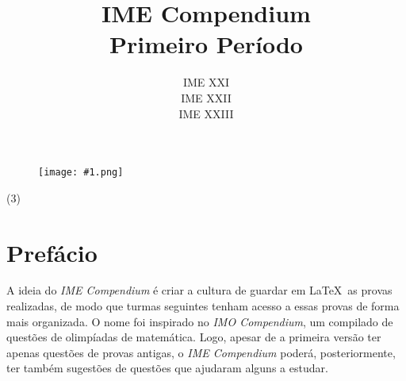 \documentclass[12pt,a4paper]{article}
\title{{\myfont IME Compendium\\\Large Primeiro Período}}
\author{IME XXI \\ IME XXII \\ IME XXIII}
\date{}
\newcommand{\img}[3]{\begin{figure}[#3]
\centering
\texttt{[image: \#1.png]}
\end{figure}}
\begin{document}
\onehalfspacing
\begin{titlepage}

\clearpage\maketitle
\thispagestyle{empty}

\pagecolor{purple}\afterpage{\nopagecolor}

\iffalse
\begin{figure}[h]
\centering
\texttt{[image: logo.png]}
\end{figure}
\fi

{
\img{logo}{8}{h}
}

\begin{tasks}[label=\large{@}](3)
\end{tasks}

\iffalse
\centering{\large{Little Frozen}}\\
\centering{\large{Henriques}}\\
\centering{\large{Hobbit da ZO}}\\
\centering{\large{Geniozinho do CSI}}\\
\centering{\large{Mocador do bigode}}\\
\centering{\large{Desmocador camarada}}\\
\centering{\large{Terrorista do Sanhaço}}\\
\centering{\large{CJolo}}
\fi
\end{titlepage}

\newpage

\tableofcontents

\newpage

\section{Prefácio}

A ideia do \textit{IME Compendium} é criar a cultura de guardar em \LaTeX \ as provas realizadas, de modo que turmas seguintes tenham acesso a essas provas de forma mais organizada.
O nome foi inspirado no \textit{IMO Compendium}, um compilado de questões de olimpíadas de matemática. Logo, apesar de a primeira versão ter apenas questões de provas antigas, o \textit{IME Compendium} poderá, posteriormente, ter também sugestões de questões que ajudaram alguns a estudar.
\end{document}
